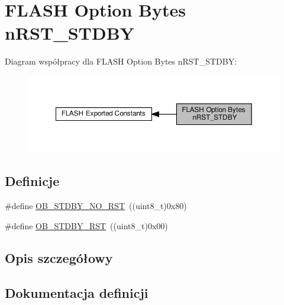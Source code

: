 \hypertarget{group___f_l_a_s_h_ex___option___bytes__n_r_s_t___s_t_d_b_y}{}\section{F\+L\+A\+SH Option Bytes n\+R\+S\+T\+\_\+\+S\+T\+D\+BY}
\label{group___f_l_a_s_h_ex___option___bytes__n_r_s_t___s_t_d_b_y}
Diagram współpracy dla F\+L\+A\+SH Option Bytes n\+R\+S\+T\+\_\+\+S\+T\+D\+BY\+:\nopagebreak
\begin{figure}[H]
\begin{center}
\leavevmode
\includegraphics[width=350pt]{group___f_l_a_s_h_ex___option___bytes__n_r_s_t___s_t_d_b_y}
\end{center}
\end{figure}
\subsection*{Definicje}
\begin{DoxyCompactItemize}
\item 
\#define \hyperlink{group___f_l_a_s_h_ex___option___bytes__n_r_s_t___s_t_d_b_y_gad776ed7b3b9a98013aac9976eedb7e94}{O\+B\+\_\+\+S\+T\+D\+B\+Y\+\_\+\+N\+O\+\_\+\+R\+ST}~((uint8\+\_\+t)0x80)
\item 
\#define \hyperlink{group___f_l_a_s_h_ex___option___bytes__n_r_s_t___s_t_d_b_y_ga69451a6f69247528f58735c9c83499ce}{O\+B\+\_\+\+S\+T\+D\+B\+Y\+\_\+\+R\+ST}~((uint8\+\_\+t)0x00)
\end{DoxyCompactItemize}


\subsection{Opis szczegółowy}


\subsection{Dokumentacja definicji}
\mbox{\label{group___f_l_a_s_h_ex___option___bytes__n_r_s_t___s_t_d_b_y_gad776ed7b3b9a98013aac9976eedb7e94}} 

